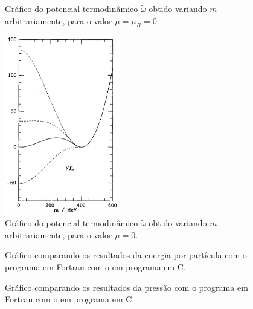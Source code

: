 
\begin{figure}
	
	\caption{Gráfico do potencial termodinâmico $\tilde{\omega}$ obtido variando $m$ arbitrariamente, para o valor $\mu = \mu_R = 0$. \protect}
	\label{Fig:pot_term_analysys_NJL-Buballa_Set_1}
\end{figure}

\begin{figure}
	\includegraphics[width=0.45\textwidth]{graphics/Therm_pot_analysis/Pot_buballa.png}
	\caption{Gráfico do potencial termodinâmico $\tilde{\omega}$ obtido variando $m$ arbitrariamente, para o valor $\mu = 0$.}
	\label{Fig:pot_term_analysys_Buballa_NJL-Buballa_Set_1}
\end{figure}

\begin{figure}
	
	\caption{Gráfico comparando os resultados da energia por partícula com o programa em Fortran com o em programa em C. \protect}
	\label{Fig:energy_Comp_C_F}
\end{figure}

\begin{figure}
	
	\caption{Gráfico comparando os resultados da pressão com o programa em Fortran com o em programa em C. \protect}
	\label{Fig:pressure_Comp_C_F}
\end{figure}

\FloatBarrier

